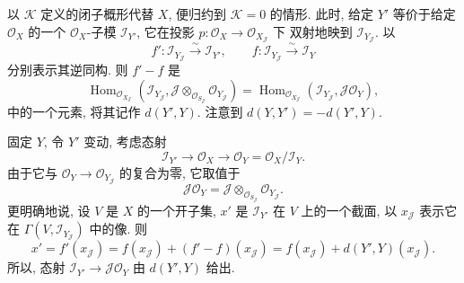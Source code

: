 \begin{center}
\end{center}

以 \(\mathscr K\) 定义的闭子概形代替 \(X\),
便归约到 \(\mathscr K=0\) 的情形.
此时, 给定 \(Y'\) 等价于给定 \(\mathscr O_X\) 的一个
\(\mathscr O_X\)-子模 \(\mathscr I_{Y'}\),
它在投影 \(p:\mathscr O_X\to\mathscr O_{X_{\mathscr J}}\) 下
双射地映到 \(\mathscr I_{Y_{\mathscr J}}\).
以
\[
 f':\mathscr I_{Y_{\mathscr J}}\xrightarrow{\sim}\mathscr I_{Y'},
 \qquad
 f:\mathscr I_{Y_{\mathscr J}}\xrightarrow{\sim}\mathscr I_Y
\]
分别表示其逆同构. 则 \(f'-f\) 是
\[
 \operatorname{Hom}_{\mathscr O_{X_{\mathscr J}}}
 \left(
  \mathscr I_{Y_{\mathscr J}},
  \mathscr J\otimes_{\mathscr O_{S_{\mathscr J}}}
  \mathscr O_{Y_{\mathscr J}}
 \right)
 =\operatorname{Hom}_{\mathscr O_{X_{\mathscr J}}}
  (\mathscr I_{Y_{\mathscr J}},\mathscr J\mathscr O_Y),
\]
中的一个元素, 将其记作 \(d(Y',Y)\).
注意到 \(d(Y,Y')=-d(Y',Y)\).

固定 \(Y\), 令 \(Y'\) 变动, 考虑态射
\[
 \mathscr I_{Y'}\longrightarrow\mathscr O_X\longrightarrow
 \mathscr O_Y=\mathscr O_X/\mathscr I_Y.
\]
由于它与 \(\mathscr O_Y\to\mathscr O_{Y_{\mathscr J}}\)
的复合为零, 它取值于
\[
 \mathscr J\mathscr O_Y
 =\mathscr J\otimes_{\mathscr O_{S_{\mathscr J}}}
  \mathscr O_{Y_{\mathscr J}}.
\]
更明确地说, 设 \(V\) 是 \(X\) 的一个开子集,
\(x'\) 是 \(\mathscr I_{Y'}\) 在 \(V\) 上的一个截面,
以 \(x_{\mathscr J}\) 表示它在
\(\Gamma(V,\mathscr I_{Y_{\mathscr J}})\) 中的像. 则
\[
 x'=f'(x_{\mathscr J})
   =f(x_{\mathscr J})+(f'-f)(x_{\mathscr J})
   =f(x_{\mathscr J})+d(Y',Y)(x_{\mathscr J}).
\]
所以, 态射 \(\mathscr I_{Y'}\to\mathscr J\mathscr O_Y\)
由 \(d(Y',Y)\) 给出.


